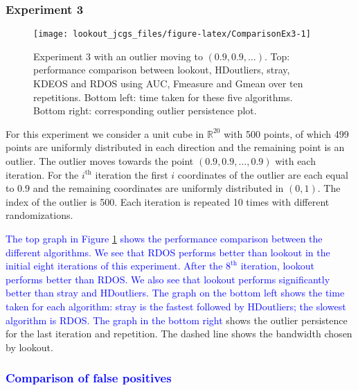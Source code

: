\documentclass[12pt]{article}
\theoremstyle{definition}
\theoremstyle{definition}
\theoremstyle{definition}
\theoremstyle{definition}
\theoremstyle{remark}
\begin{document}
\hypertarget{experiment-3}{%
\subsubsection*{Experiment 3}\label{experiment-3}}

\begin{figure}[b]

{\centering \texttt{[image: lookout\_jcgs\_files/figure-latex/ComparisonEx3-1]} 

}

\caption{Experiment 3 with an outlier moving to $(0.9, 0.9, \dots)$. Top: performance comparison between lookout, HDoutliers, stray, KDEOS and RDOS using AUC, Fmeasure and Gmean over ten repetitions. Bottom left: time taken for these five algorithms. Bottom right: corresponding outlier persistence plot.}\label{fig:ComparisonEx3}
\end{figure}

For this experiment we consider a unit cube in \(\mathbb{R}^{20}\) with 500 points, of which 499 points are uniformly distributed in each direction and the remaining point is an outlier. The outlier moves towards the point \(\left( 0.9, 0.9, \dots, 0.9 \right)\) with each iteration. For the \(i^{\text{th}}\) iteration the first \(i\) coordinates of the outlier are each equal to \(0.9\) and the remaining coordinates are uniformly distributed in \((0,1)\). The index of the outlier is 500. Each iteration is repeated 10 times with different randomizations.

\textcolor{blue}{The top graph in Figure \ref{fig:ComparisonEx3} shows the performance comparison between the different algorithms. We see that RDOS performs better than lookout in the initial eight iterations of this experiment. After the $8^{\text{th}}$ iteration, lookout performs better than RDOS. We also see that lookout performs significantly better than stray and HDoutliers. The graph on the bottom left shows the time taken for each algorithm: stray is the fastest followed by HDoutliers; the slowest algorithm is RDOS. The graph in the bottom right} shows the outlier persistence for the last iteration and repetition. The dashed line shows the bandwidth chosen by lookout.

\hypertarget{section}{%
\subsubsection*{\texorpdfstring{\textcolor{blue}{Comparison of false positives }}{}}\label{section}}
\end{document}
